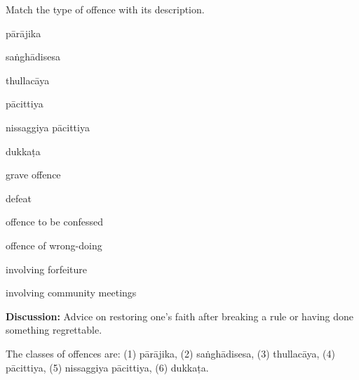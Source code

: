 \begin{exam}{\autoExamName}
\begin{problem}
\end{problem}

\problemDivide

\begin{problem*}

  Match the type of offence with its description.

  \bigskip

  \begin{multicols}{2}

    \begin{parts}

    \item \fillin{2cm}{\ref{parajika}} pārājika
    \item \fillin{2cm}{\ref{sanghadisesa}} saṅghādisesa
    \item \fillin{2cm}{\ref{thullacaya}} thullacāya
    \item \fillin{2cm}{\ref{pacittiya}} pācittiya
    \item \fillin{2cm}{\ref{nissaggiya}} nissaggiya pācittiya
    \item \fillin{2cm}{\ref{dukkata}} dukkaṭa

    \columnbreak

    \bMatchChoices

    \item\label{thullacaya} grave offence
    \item\label{parajika} defeat
    \item\label{pacittiya} offence to be confessed
    \item\label{dukkata} offence of wrong-doing
    \item\label{nissaggiya} involving forfeiture
    \item\label{sanghadisesa} involving community meetings

    \eMatchChoices
      
    \end{parts}
    
  \end{multicols}

  \bigskip

  \textbf{Discussion:} Advice on restoring one's faith after breaking a rule or
  having done something regrettable.

  \begin{solution}
    The classes of offences are: (1) pārājika, (2) saṅghādisesa, (3) thullacāya,
    (4) pācittiya, (5) nissaggiya pācittiya, (6) dukkaṭa.
  \end{solution}


\end{problem*}
\end{exam}
